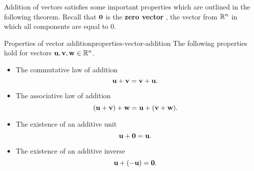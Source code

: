 Addition of vectors satisfies some important properties which are
outlined in the following theorem.  Recall that $\vect{0}$ is the
\textbf{zero vector}%
%
, the vector from $\mathbb{R}^n$ in which all
components are equal to $0$.

\begin{theorem}{Properties of vector addition}{properties-vector-addition}
  The following properties hold for vectors
  $\vect{u},\vect{v},\vect{w}\in\R^n$.%
  \begin{itemize}
  \item The commutative law of addition%
    \begin{equation*}
      \vect{u}+\vect{v}=\vect{v}+\vect{u}.
    \end{equation*}
  \item The associative law of addition
    \begin{equation*}
      (\vect{u}+\vect{v})+\vect{w} = \vect{u}+(\vect{v}+\vect{w}).
    \end{equation*}
  \item The existence of an additive unit%
    \begin{equation*}
      \vect{u}+\vect{0}=\vect{u}.
    \end{equation*}
  \item The existence of an additive inverse
    \begin{equation*}
      \vect{u}+(-\vect{u}) =\vect{0}.
    \end{equation*}
  \end{itemize}
\end{theorem}

